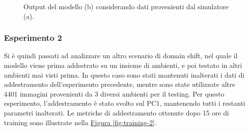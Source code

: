 \documentclass[12pt]{report}
\begin{document}
\begin{figure}[h!]
	\centering
	\hspace{0.01\textwidth}
	\caption{Output del modello (b) considerando dati provenienti dal simulatore (a).}
	\label{fig:prediction-1}
\end{figure}

\subsubsection{Esperimento 2}
\label{sec:esperimento_2}

Si è quindi passati ad analizzare un altro scenario di domain shift, nel quale il modello viene prima addestrato su un insieme di ambienti, e poi testato in altri ambienti mai visti prima. In questo caso sono stati mantenuti inalterati i dati di addestramento dell'esperimento precedente, mentre sono state utilizzate altre 4401 immagini provenienti da 3 diversi ambienti per il testing. Per questo esperimento, l'addestramento è stato svolto sul PC1, mantenendo tutti i restanti parametri inalterati. Le metriche di addestramento ottenute dopo 15 ore di training sono illustrate nella \hyperref[fig:training-2]{Figura \ref{fig:training-2}}.
\end{document}
